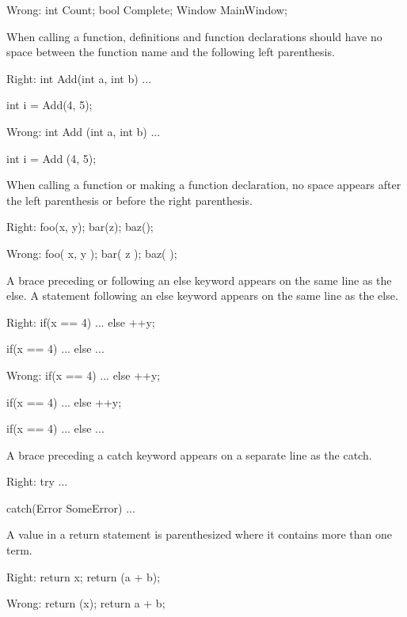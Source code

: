 Wrong:
\startCodeExample
int Count;
bool Complete;
Window MainWindow;
\stopCodeExample

\item
When calling a function, definitions and function declarations should have no space between the function name and the following left parenthesis.

Right:
\startCodeExample
int Add(int a, int b)
{ 
    ... 
}

int i = Add(4, 5);
\stopCodeExample

Wrong:
\startCodeExample
int Add (int a, int b)
{
    ...
}

int i = Add (4, 5);
\stopCodeExample

\item
When calling a function or making a function declaration, no space appears after the left parenthesis or before the right parenthesis.

Right:
\startCodeExample
foo(x, y);
bar(z);
baz();
\stopCodeExample

Wrong:
\startCodeExample
foo( x, y );
bar( z );
baz( );
\stopCodeExample

\item
A brace preceding or following an else keyword appears on the same line as the else. A statement following an else keyword appears on the same line as the else. 

Right:
\startCodeExample
if(x == 4)
{
    ...
}
else
  ++y;

if(x == 4)
{
    ...
}
else
{
    ...
}
\stopCodeExample

Wrong:
\startCodeExample
if(x == 4) {
    ...
}
else ++y;

if(x == 4) {
    ...
} else ++y;

if(x == 4) {
    ...
}
else {
    ...
}
\stopCodeExample

\item
A brace preceding a catch keyword appears on a separate line as the catch. 

Right:
\startCodeExample
try
{
    ...
}

catch(Error SomeError)
{
    ...
}
\stopCodeExample

\item
A value in a return statement is parenthesized where it contains more than one term.

Right:
\startCodeExample
return x;
return (a + b);
\stopCodeExample

Wrong:
\startCodeExample
return (x);
return a + b;
\stopCodeExample


